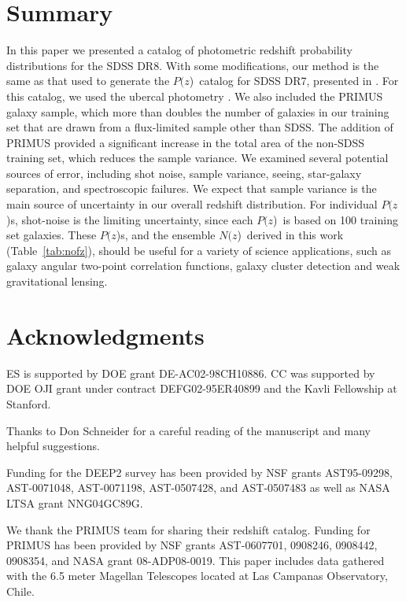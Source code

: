 \documentclass[12pt,preprint]{aastex}
\newcommand{\pofz}{$P(z$)}
\newcommand{\nofz}{$N(z$)}
\begin{document}
\section{Summary} \label{sec:summary}

In this paper we presented a catalog of photometric redshift probability
distributions for the SDSS DR8.  With some modifications, our method is the
same as that used to generate the \pofz\ catalog for SDSS DR7, presented in
\cite{CunhaPhotoz09}.  For this catalog, we used the ubercal photometry
\citep{Nikhil08}.  We also included the PRIMUS galaxy sample, which more than
doubles the number of galaxies in our training set that are drawn from a
flux-limited sample other than SDSS.  The addition of PRIMUS provided a
significant increase in the total area of the non-SDSS training set, which
reduces the sample variance.  We examined several potential sources of error,
including shot noise, sample variance, seeing, star-galaxy separation, and
spectroscopic failures.  We expect that sample variance is the main source of
uncertainty in our overall redshift distribution.  For individual \pofz s,
shot-noise is the limiting uncertainty, since each \pofz\ is based on 100
training set galaxies.  These \pofz s, and the ensemble \nofz\ derived in this
work (Table~\ref{tab:nofz}), should be useful for a variety of science
applications, such as galaxy angular two-point correlation functions, galaxy
cluster detection and weak gravitational lensing.


\section*{Acknowledgments}

ES is supported by DOE grant DE-AC02-98CH10886.  CC was supported by DOE OJI
grant under contract DEFG02-95ER40899 and the Kavli Fellowship at Stanford.

Thanks to Don Schneider for a careful reading of the manuscript and many
helpful suggestions.

Funding for the DEEP2 survey has been provided by NSF grants AST95-09298,
AST-0071048, AST-0071198, AST-0507428, and AST-0507483 as well as NASA LTSA
grant NNG04GC89G. 

We thank the PRIMUS team for sharing their redshift catalog. Funding for PRIMUS
has been provided by NSF grants AST-0607701, 0908246, 0908442, 0908354, and
NASA grant 08-ADP08-0019. This paper includes data gathered with the 6.5 meter
Magellan Telescopes located at Las Campanas Observatory, Chile.
\end{document}
